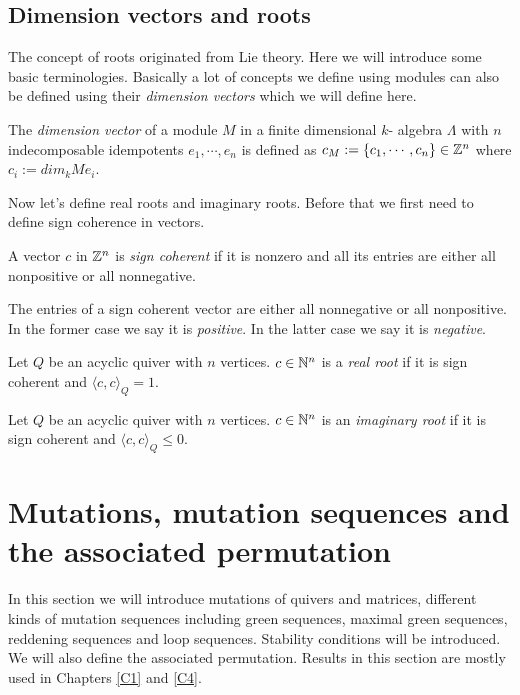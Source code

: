 \subsection{Dimension vectors and roots}
\indent The concept of roots originated from Lie theory. Here we will introduce some basic terminologies. Basically a lot of concepts we define using modules can also be defined using their \textit{dimension vectors} which we will define here.\\
\begin{definition}
The \textit{dimension vector} of a module $M$ in a finite dimensional $k$- algebra $\Lambda$ with $n$ indecomposable idempotents $e_1,\cdots, e_n$ is defined as $c_M:=\{c_1,\cdots, c_n\}\in\mathbb{Z}^n$ where $c_i:= dim_k Me_i$.
\end{definition}
\indent Now let's define real roots and imaginary roots. Before that we first need to define sign coherence in vectors.\\
\begin{definition}
A vector $c$ in $\mathbb{Z}^n$ is \textit{sign coherent} if it is nonzero and all its entries are either all nonpositive or all nonnegative.
\end{definition}
\indent The entries of a sign coherent vector are either all nonnegative or all nonpositive. In the former case we say it is \textit{positive}. In the latter case we say it is \textit{negative}.\\
\begin{definition}
Let $Q$ be an acyclic quiver with $n$ vertices. $c\in \mathbb{N}^n$ is a \textit{real root} if it is sign coherent and $\langle c, c\rangle_Q = 1$.
\end{definition}
\begin{definition}
Let $Q$ be an acyclic quiver with $n$ vertices. $c\in \mathbb{N}^n$ is an \textit{imaginary root} if it is sign coherent and $\langle c, c\rangle_Q \leq 0$.
\end{definition}
\section{Mutations, mutation sequences and the associated permutation}
\indent In this section we will introduce mutations of quivers and matrices, different kinds of mutation sequences including green sequences, maximal green sequences, reddening sequences and loop sequences. Stability conditions will be introduced. We will also define the associated permutation. Results in this section are mostly used in Chapters \ref{C1} and \ref{C4}.\\
